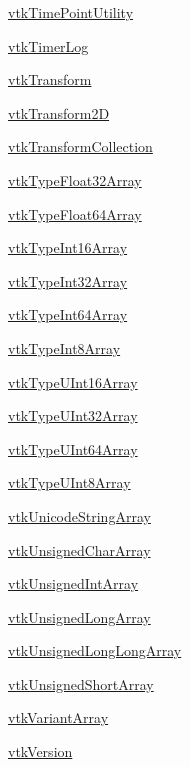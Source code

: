 \begin{DoxyItemize}
\item \hyperlink{vtkcommon_vtktimepointutility}{vtk\-Time\-Point\-Utility}  
\item \hyperlink{vtkcommon_vtktimerlog}{vtk\-Timer\-Log}  
\item \hyperlink{vtkcommon_vtktransform}{vtk\-Transform}  
\item \hyperlink{vtkcommon_vtktransform2d}{vtk\-Transform2\-D}  
\item \hyperlink{vtkcommon_vtktransformcollection}{vtk\-Transform\-Collection}  
\item \hyperlink{vtkcommon_vtktypefloat32array}{vtk\-Type\-Float32\-Array}  
\item \hyperlink{vtkcommon_vtktypefloat64array}{vtk\-Type\-Float64\-Array}  
\item \hyperlink{vtkcommon_vtktypeint16array}{vtk\-Type\-Int16\-Array}  
\item \hyperlink{vtkcommon_vtktypeint32array}{vtk\-Type\-Int32\-Array}  
\item \hyperlink{vtkcommon_vtktypeint64array}{vtk\-Type\-Int64\-Array}  
\item \hyperlink{vtkcommon_vtktypeint8array}{vtk\-Type\-Int8\-Array}  
\item \hyperlink{vtkcommon_vtktypeuint16array}{vtk\-Type\-U\-Int16\-Array}  
\item \hyperlink{vtkcommon_vtktypeuint32array}{vtk\-Type\-U\-Int32\-Array}  
\item \hyperlink{vtkcommon_vtktypeuint64array}{vtk\-Type\-U\-Int64\-Array}  
\item \hyperlink{vtkcommon_vtktypeuint8array}{vtk\-Type\-U\-Int8\-Array}  
\item \hyperlink{vtkcommon_vtkunicodestringarray}{vtk\-Unicode\-String\-Array}  
\item \hyperlink{vtkcommon_vtkunsignedchararray}{vtk\-Unsigned\-Char\-Array}  
\item \hyperlink{vtkcommon_vtkunsignedintarray}{vtk\-Unsigned\-Int\-Array}  
\item \hyperlink{vtkcommon_vtkunsignedlongarray}{vtk\-Unsigned\-Long\-Array}  
\item \hyperlink{vtkcommon_vtkunsignedlonglongarray}{vtk\-Unsigned\-Long\-Long\-Array}  
\item \hyperlink{vtkcommon_vtkunsignedshortarray}{vtk\-Unsigned\-Short\-Array}  
\item \hyperlink{vtkcommon_vtkvariantarray}{vtk\-Variant\-Array}  
\item \hyperlink{vtkcommon_vtkversion}{vtk\-Version}  

\end{DoxyItemize}
